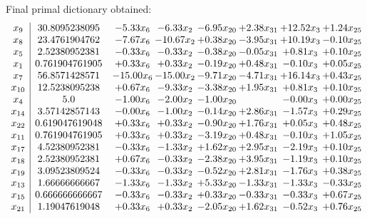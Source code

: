 \documentclass[8pt]{article}
\begin{document}
 Final primal dictionary obtained: 
\[\begin{array}{c| c c@{\hskip 2pt} c@{\hskip 2pt} c@{\hskip 2pt} c@{\hskip 2pt} c@{\hskip 2pt} c@{\hskip 2pt} }
 x_{9}   &  30.8095238095 & -5.33 x_{6} & -6.33 x_{2} & -6.95 x_{20} & +  2.38 x_{31} & + 12.52 x_{3} & +  1.24 x_{25}\\
 x_{8}   &  23.4761904762 & -7.67 x_{6} & -10.67 x_{2} & +  0.38 x_{20} & -3.95 x_{31} & + 10.19 x_{3} & -0.10 x_{25}\\
 x_{5}   &  2.52380952381 & -0.33 x_{6} & -0.33 x_{2} & -0.38 x_{20} & -0.05 x_{31} & +  0.81 x_{3} & +  0.10 x_{25}\\
 x_{1}   &  0.761904761905 & +  0.33 x_{6} & +  0.33 x_{2} & -0.19 x_{20} & +  0.48 x_{31} & -0.10 x_{3} & +  0.05 x_{25}\\
 x_{7}   &  56.8571428571 & -15.00 x_{6} & -15.00 x_{2} & -9.71 x_{20} & -4.71 x_{31} & + 16.14 x_{3} & +  0.43 x_{25}\\
 x_{10}   &  12.5238095238 & +  0.67 x_{6} & -9.33 x_{2} & -3.38 x_{20} & +  1.95 x_{31} & +  0.81 x_{3} & +  0.10 x_{25}\\
 x_{4}   &  5.0 & -1.00 x_{6} & -2.00 x_{2} & -1.00 x_{20} &   & -0.00 x_{3} & +  0.00 x_{25}\\
 x_{14}   &  3.57142857143 & -0.00 x_{6} & -1.00 x_{2} & -0.14 x_{20} & +  2.86 x_{31} & -1.57 x_{3} & +  0.29 x_{25}\\
 x_{22}   &  0.619047619048 & +  0.33 x_{6} & +  0.33 x_{2} & -0.90 x_{20} & +  1.76 x_{31} & +  0.05 x_{3} & +  0.48 x_{25}\\
 x_{11}   &  0.761904761905 & +  0.33 x_{6} & +  0.33 x_{2} & -3.19 x_{20} & +  0.48 x_{31} & -0.10 x_{3} & +  1.05 x_{25}\\
 x_{17}   &  4.52380952381 & -0.33 x_{6} & -1.33 x_{2} & +  1.62 x_{20} & +  2.95 x_{31} & -2.19 x_{3} & +  0.10 x_{25}\\
 x_{18}   &  2.52380952381 & +  0.67 x_{6} & -0.33 x_{2} & -2.38 x_{20} & +  3.95 x_{31} & -1.19 x_{3} & +  0.10 x_{25}\\
 x_{19}   &  3.09523809524 & -0.33 x_{6} & -0.33 x_{2} & -0.52 x_{20} & +  2.81 x_{31} & -1.76 x_{3} & +  0.38 x_{25}\\
 x_{13}   &  1.66666666667 & -1.33 x_{6} & -1.33 x_{2} & +  5.33 x_{20} & -1.33 x_{31} & -1.33 x_{3} & -0.33 x_{25}\\
 x_{15}   &  0.666666666667 & -0.33 x_{6} & -0.33 x_{2} & +  0.33 x_{20} & -0.33 x_{31} & -0.33 x_{3} & +  0.67 x_{25}\\
 x_{21}   &  1.19047619048 & +  0.33 x_{6} & +  0.33 x_{2} & -2.05 x_{20} & +  1.62 x_{31} & -0.52 x_{3} & +  0.76 x_{25}\\

\end{array}\]
\end{document}
